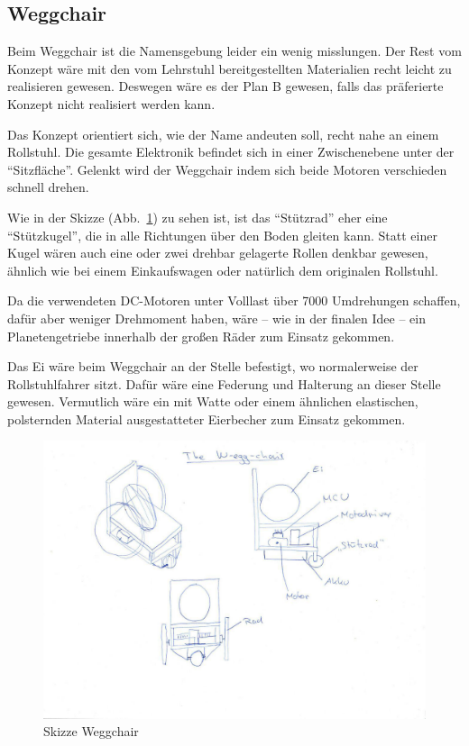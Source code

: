 \subsection{Weggchair}
Beim Weggchair ist die Namensgebung leider ein wenig misslungen. 
Der Rest vom Konzept wäre mit den vom Lehrstuhl bereitgestellten Materialien recht leicht zu realisieren gewesen.
Deswegen wäre es der Plan B gewesen, falls das präferierte Konzept nicht realisiert werden kann. 

Das Konzept orientiert sich, wie der Name andeuten soll, recht nahe an einem Rollstuhl. 
Die gesamte Elektronik befindet sich in einer Zwischenebene unter der ``Sitzfläche''. 
Gelenkt wird der Weggchair indem sich beide Motoren verschieden schnell drehen. 

Wie in der Skizze (Abb.~\ref{bild:weggchair}) zu sehen ist, ist das ``Stützrad'' eher eine ``Stützkugel'', die in alle Richtungen über den Boden gleiten kann. 
Statt einer Kugel wären auch eine oder zwei drehbar gelagerte Rollen denkbar gewesen, ähnlich wie bei einem Einkaufswagen oder natürlich dem originalen Rollstuhl. 

Da die verwendeten DC-Motoren unter Volllast über 7000 Umdrehungen schaffen, dafür aber weniger Drehmoment haben, wäre -- wie in der finalen Idee -- ein Planetengetriebe innerhalb der großen Räder zum Einsatz gekommen. 

Das Ei wäre beim Weggchair an der Stelle befestigt, wo normalerweise der Rollstuhlfahrer sitzt. Dafür wäre eine Federung und Halterung an dieser Stelle gewesen. Vermutlich wäre ein mit Watte oder einem ähnlichen elastischen, polsternden Material ausgestatteter Eierbecher zum Einsatz gekommen.

\begin{figure}[!ht]
	\centering
	\includegraphics[width=\textwidth]{bilder/weggchair.jpg}
	\caption{Skizze Weggchair}
	\label{bild:weggchair}
\end{figure}


